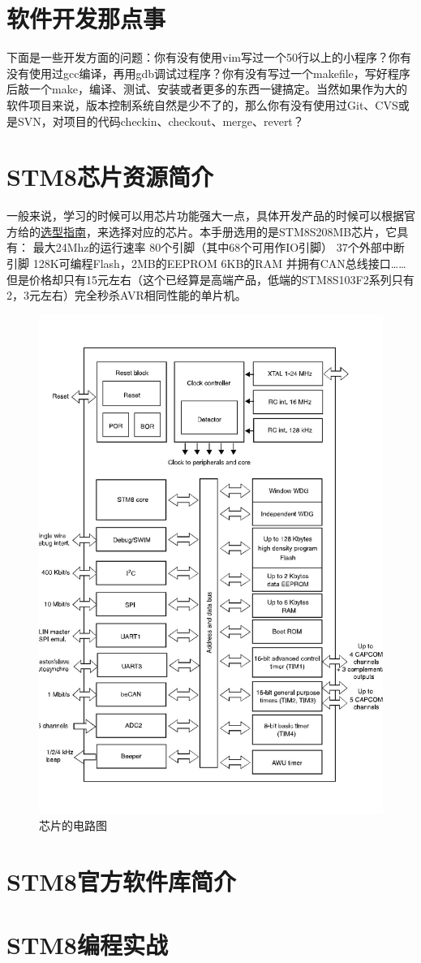 \documentclass[a4paper]{book}
\newcommand{\prechap}{第}
\newcommand{\postchap}{章}
\newcommand{\chap}[1]{\newpage\thispagestyle{empty}\chapter{#1}\label{chap:\thechapter}}
\renewcommand{\appendixname}{}
\begin{document}
\chap{软件开发那点事}

下面是一些开发方面的问题：你有没有使用vim写过一个50行以上的小程序？你有没有使用过gcc编译，再用gdb调试过程序？你有没有写过一个makefile，写好程序后敲一个make，编译、测试、安装或者更多的东西一键搞定。当然如果作为大的软件项目来说，版本控制系统自然是少不了的，那么你有没有使用过Git、CVS或是SVN，对项目的代码checkin、checkout、merge、revert？

\chap{STM8芯片资源简介}

一般来说，学习的时候可以用芯片功能强大一点，具体开发产品的时候可以根据官方给的\href{http://www.st.com/internet/com/SALES\_AND\_MARKETING\_RESOURCES/MARKETING\_COMMUNICATION/MARKETING\_BROCHURE/brstm8.pdf}{选型指南}，来选择对应的芯片。本手册选用的是STM8S208MB芯片，它具有： 最大24Mhz的运行速率 80个引脚（其中68个可用作IO引脚） 37个外部中断引脚 128K可编程Flash，2MB的EEPROM 6KB的RAM 并拥有CAN总线接口\ldots{}\ldots{} 但是价格却只有15元左右（这个已经算是高端产品，低端的STM8S103F2系列只有2，3元左右）完全秒杀AVR相同性能的单片机。

\begin{figure}[htbp]
\centering
\includegraphics{figures/circuit_diagram.jpg}
\caption{芯片的电路图}
\end{figure}

\chap{STM8官方软件库简介}

\chap{STM8编程实战}



\appendices
\renewcommand{\prechap}{\appendixname}
\renewcommand{\postchap}{}
\end{document}
